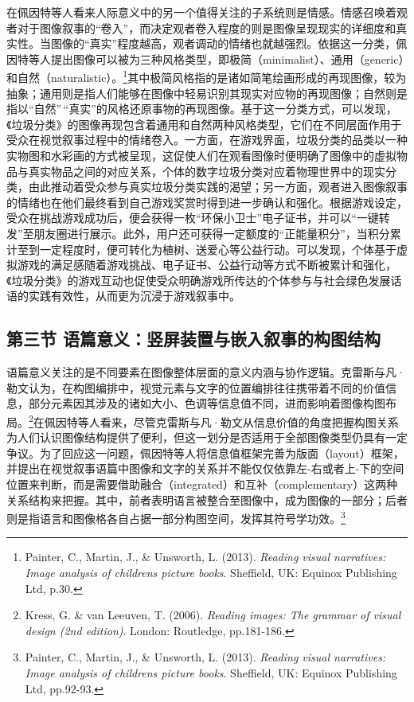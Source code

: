 在佩因特等人看来人际意义中的另一个值得关注的子系统则是情感。情感召唤着观者对于图像叙事的``卷入''，而决定观者卷入程度的则是图像呈现现实的详细度和真实性。当图像的``真实''程度越高，观者调动的情绪也就越强烈。依据这一分类，佩因特等人提出图像可以被为三种风格类型，即极简（minimalist）、通用（generic）和自然（naturalistic）。\footnote{Painter,
  C., Martin, J., \& Unsworth, L. (2013). \emph{Reading visual
  narratives: Image analysis of children\textquotesingle s picture
  books}. Sheffield, UK: Equinox Publishing Ltd, p.30.}其中极简风格指的是诸如简笔绘画形成的再现图像，较为抽象；通用则是指人们能够在图像中轻易识别其现实对应物的再现图像；自然则是指以``自然''\,``真实''的风格还原事物的再现图像。基于这一分类方式，可以发现，《垃圾分类》的图像再现包含着通用和自然两种风格类型，它们在不同层面作用于受众在视觉叙事过程中的情绪卷入。一方面，在游戏界面，垃圾分类的品类以一种实物图和水彩画的方式被呈现，这促使人们在观看图像时便明确了图像中的虚拟物品与真实物品之间的对应关系，个体的数字垃圾分类对应着物理世界中的现实分类，由此推动着受众参与真实垃圾分类实践的渴望；另一方面，观者进入图像叙事的情绪也在他们最终看到自己游戏奖赏时得到进一步确认和强化。根据游戏设定，受众在挑战游戏成功后，便会获得一枚``环保小卫士''电子证书，并可以``一键转发''至朋友圈进行展示。此外，用户还可获得一定额度的``正能量积分''，当积分累计至到一定程度时，便可转化为植树、送爱心等公益行动。可以发现，个体基于虚拟游戏的满足感随着游戏挑战、电子证书、公益行动等方式不断被累计和强化，《垃圾分类》的游戏互动也促使受众明确游戏所传达的个体参与与社会绿色发展话语的实践有效性，从而更为沉浸于游戏叙事中。

\subsection{第三节
语篇意义：竖屏装置与嵌入叙事的构图结构}\label{ux7b2cux4e09ux8282-ux8bedux7bc7ux610fux4e49ux7ad6ux5c4fux88c5ux7f6eux4e0eux5d4cux5165ux53d9ux4e8bux7684ux6784ux56feux7ed3ux6784}

语篇意义关注的是不同要素在图像整体层面的意义内涵与协作逻辑。克雷斯与凡·勒文认为，在构图编排中，视觉元素与文字的位置编排往往携带着不同的价值信息，部分元素因其涉及的诸如大小、色调等信息值不同，进而影响着图像构图布局。\footnote{Kress,
  G. \& van Leeuven, T. (2006). \emph{Reading images: The grammar of
  visual design (2nd edition)}. London: Routledge, pp.181-186.}在佩因特等人看来，尽管克雷斯与凡·勒文从信息价值的角度把握构图关系为人们认识图像结构提供了便利，但这一划分是否适用于全部图像类型仍具有一定争议。为了回应这一问题，佩因特等人将信息值框架完善为版面（layout）框架，并提出在视觉叙事语篇中图像和文字的关系并不能仅仅依靠左-右或者上-下的空间位置来判断，而是需要借助融合（integrated）和互补（complementary）这两种关系结构来把握。其中，前者表明语言被整合至图像中，成为图像的一部分；后者则是指语言和图像格各自占据一部分构图空间，发挥其符号学功效。\footnote{Painter,
  C., Martin, J., \& Unsworth, L. (2013). \emph{Reading visual
  narratives: Image analysis of children\textquotesingle s picture
  books}. Sheffield, UK: Equinox Publishing Ltd, pp.92-93.}

